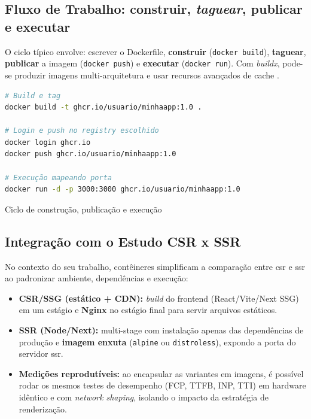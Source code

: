 \subsection{Fluxo de Trabalho: construir, \textit{taguear}, publicar e executar}
\label{sec:workflow}

O ciclo típico envolve: escrever o Dockerfile, \textbf{construir} (\texttt{docker build}), \textbf{taguear}, \textbf{publicar} a imagem (\texttt{docker push}) e \textbf{executar} (\texttt{docker run}). Com \textit{buildx}, pode-se produzir imagens multi-arquitetura e usar recursos avançados de cache \cite{docker_overview,dockerfile_ref}.

\begin{codigo}[H]
\begin{lstlisting}[language=bash]
# Build e tag
docker build -t ghcr.io/usuario/minhaapp:1.0 .

# Login e push no registry escolhido
docker login ghcr.io
docker push ghcr.io/usuario/minhaapp:1.0

# Execução mapeando porta
docker run -d -p 3000:3000 ghcr.io/usuario/minhaapp:1.0
\end{lstlisting}
\caption{Ciclo de construção, publicação e execução}
\label{lst:docker-workflow}
\end{codigo}

\subsection{Integração com o Estudo CSR x SSR}
\label{sec:docker-csr-ssr}

No contexto do seu trabalho, contêineres simplificam a comparação entre \acrshort{csr} e \acrshort{ssr} ao padronizar ambiente, dependências e execução:

\begin{itemize}
  \item \textbf{CSR/SSG (estático + CDN):} \textit{build} do frontend (React/Vite/Next SSG) em um estágio e \textbf{Nginx} no estágio final para servir arquivos estáticos.  
  \item \textbf{SSR (Node/Next):} multi-stage com instalação apenas das dependências de produção e \textbf{imagem enxuta} (\texttt{alpine} ou \texttt{distroless}), expondo a porta do servidor \acrshort{ssr}.
  \item \textbf{Medições reprodutíveis:} ao encapsular as variantes em imagens, é possível rodar os mesmos testes de desempenho (FCP, TTFB, INP, TTI) em hardware idêntico e com \textit{network shaping}, isolando o impacto da estratégia de renderização.
\end{itemize}

